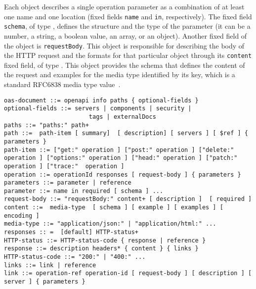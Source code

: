 Each  object describes a single operation parameter as a combination of at least one name and one location (fixed fields {\tt name} and {\tt in}, respectively). The fixed field  \texttt{schema}, of type , defines the structure and the type of the parameter (it can be a number, a string, a boolean value, an array, or an object).%
Another fixed field of the  object is {\tt requestBody}. This object is responsible for describing the body of the HTTP request  and the formats for that particular  object through its   \texttt{content} fixed field, of type . This object provides the schema that defines the content of the request and examples for the media type identified by its key, which is a standard RFC6838 media type value~\cite{RFC-6838}.

\begin{lstlisting}[caption={An excerpt from the Backus-Naus form of the OpenAPI specification (in YAML).},label=lst:oas_backusnaur,basicstyle={\ttfamily\small},frame=single,breaklines=true,tabsize=4]
oas-document ::= openapi info paths { optional-fields }
optional-fields ::= servers | components | security | 
						tags | externalDocs
paths ::= "paths:" path+
path ::=  path-item [ summary]  [ description] [ servers ] [ $ref ] { parameters } 
path-item ::= ["get:" operation ] ["post:" operation ] ["delete:" operation ] ["options:" operation ] ["head:" operation ] ["patch:" operation ] ["trace:"  operation ]
operation ::= operationId responses [ request-body ] { parameters } 
parameters ::= parameter | reference
parameter ::= name in required [ schema ] ...
request-body ::= "requestBody:" content+ [ description ]  [ required ]
content ::=  media-type  [ schema ] [ example ] [ examples ] [ encoding ]
media-type ::= "application/json:" | "application/html:" ...
responses :: =  [default] HTTP-status+
HTTP-status ::= HTTP-status-code { response | reference }
response ::= description headers* { content } { links }
HTTP-status-code ::= "200:" | "400:" ...
links ::= link | reference
link ::= operation-ref operation-id [ request-body ] [ description ] [ server ] { parameters }
\end{lstlisting}


